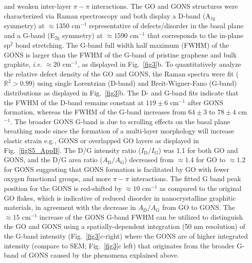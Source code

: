 and weaken inter-layer $\pi-\pi$ interactions.\cite{Hwang2014} The GO and GONS structures were characterized via Raman spectroscopy and both display a D-band (A$_{1\mathrm{g}}$ symmetry) at $\approx1350$ cm$^{-1}$ representative of defects/disorder in the basal plane and a G-band (E$_{2\mathrm{g}}$ symmetry) at $\approx 1590$ cm$^{-1}$ that corresponds to the in-plane sp$^{2}$ bond stretching.\cite{Ferrari2000,Dresselhaus2010,Ferrari2013,Ferrari2006} The G-band full width half maximum (FWHM) of the GONS is larger than the FWHM of the G-band of pristine graphene and bulk graphite,\cite{Ferrari2006,Rao2011} \textit{i.e.} $\approx 20$ cm$^{-1}$,\cite{Casiraghi2007} as displayed in Fig.~\ref{fig3}b. To quantitatively analyze the relative defect density of the GO and GONS, the Raman spectra were fit ($\mathbb{R}^{2} > 0.99$) using single Lorentzian (D-band) and Breit-Wigner-Fano (G-band) distributions as displayed in Fig.~\ref{fig3}b.\cite{Mallet2014,Mallet2014a} The D- and G-band fits indicate that the FWHM of the D-band remains constant at $119 \pm 6$ cm$^{-1}$ after GONS formation, whereas the FWHM of the G-band increases from $64 \pm 3$ to $78 \pm 4$ cm$^{-1}$. The broader GONS G-band is due to scrolling effects on the basal plane breathing mode\cite{Xie2009} since the formation of a multi-layer morphology will increase elastic strain\cite{Roy2008,Gao2010} e.g., GONS or overlapped GO layers as displayed in Fig.~\ref{figS5_AppB}. The D/G intensity ratio ($I_{\mathrm{D}}/I_{\mathrm{G}}$) was 1.1 for both GO and GONS,\cite{Gao2010} and the D/G area ratio ($A_{\mathrm{D}}/A_{\mathrm{G}}$) decreased from $\approx 1.4$ for GO to $\approx 1.2$ for GONS suggesting that GONS formation is facilitated by GO with fewer oxygen functional groups, and more $\pi-\pi$ interactions.\cite{Hwang2014} The fitted G band peak position for the GONS is red-shifted by $\approx 10$ cm$^{-1}$ as compared to the original GO flakes, which is indicative of reduced disorder in nanocrystalline graphitic materials,\cite{Ferrari2000} in agreement with the decrease in $A_{\mathrm{D}}/A_{\mathrm{G}}$ from GO to GONS. The $\approx 15$ cm$^{-1}$ increase of the GONS G-band FWHM can be utilized to distinguish the GO and GONS using a spatially-dependent integration (50 nm resolution) of the G-band intensity (Fig.~\ref{fig3}c-right) where the GONS are of higher integrated intensity (compare to SEM; Fig.~\ref{fig3}c left) that originates from the broader G-band of GONS caused by the phenomena explained above.


